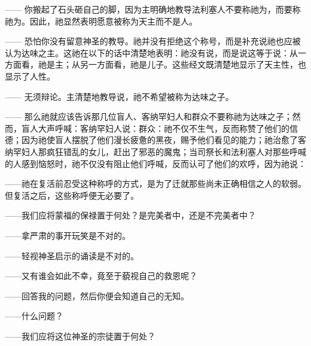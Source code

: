 —— 你搬起了石头砸自己的脚，因为主明确地教导法利塞人不要称祂为，而要称祂为。因此，祂显然表明愿意被称为天主而不是人。\par

—— 恐怕你没有留意神圣的教导。祂并没有拒绝这个称号，而是补充说祂也应被认为达味之主。这祂在以下的话中清楚地表明：祂没有说，而是说这等于说：从一方面看，祂是主；从另一方面看，祂是儿子。这些经文既清楚地显示了天主性，也显示了人性。\par

—— 无须辩论。主清楚地教导说，祂不希望被称为达味之子。\par

—— 那么祂就应该告诉那几位盲人、客纳罕妇人和群众不要称祂为达味之子；然而，盲人大声呼喊：客纳罕妇人说：群众：祂不仅不生气，反而称赞了他们的信德；因为祂使盲人摆脱了他们漫长疲惫的黑夜，赐予他们看见的能力；祂治愈了客纳罕妇人那疯狂错乱的女儿，赶出了邪恶的魔鬼；当司祭长和法利塞人对那些呼喊的人感到恼怒时，祂不仅没有阻止他们呼喊，反而认可了他们的欢呼，因为祂说：\par

——祂在复活前忍受这种称呼的方式，是为了迁就那些尚未正确相信之人的软弱。但复活之后，这些称呼便无必要了。\par

——我们应将蒙福的保禄置于何处？是完美者中，还是不完美者中？\par

——拿严肃的事开玩笑是不对的。\par

——轻视神圣启示的诵读是不对的。\par

——又有谁会如此不幸，竟至于藐视自己的救恩呢？\par

——回答我的问题，然后你便会知道自己的无知。\par

——什么问题？\par

——我们应将这位神圣的宗徒置于何处？\par

